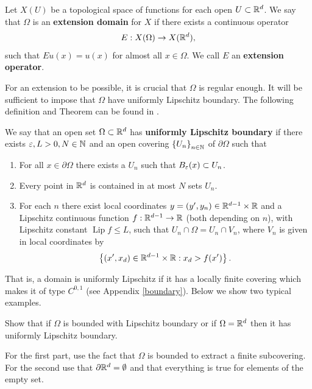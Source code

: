 \documentclass[
    a4paper,
    DIV=14,
    abstract=true,
    numbers=noenddot
]{scrartcl}
\begin{document}
\begin{definition}\label{extension domain}
	Let $X(U)$ be a topological space of functions for each open $U \subset \mathbb{R}^d$. We say that $\Omega $ is an \textbf{extension domain} for $X$ if there exists a continuous operator
	\begin{align*}
		E: X(\Omega ) \to X(\mathbb{R}^d),
	\end{align*}
	such that $Eu(x)=u(x)$ for almost all $x \in \Omega $. We call $E$ an \textbf{extension operator}.
\end{definition}

For an extension to be possible, it is crucial that $\Omega$ is regular enough. It will be sufficient to impose that $\Omega$ have uniformly Lipschitz boundary. The following definition and Theorem can be found in \cite[Section 13]{leoni2017first}.

\begin{definition}\label{uniformly Lipschitz domain}
	We say that an open set $\Omega \subset \mathbb{R}^d$ has \textbf{uniformly Lipschitz boundary} if there exists $\varepsilon,L>0, N \in \mathbb{N}$ and an open covering $\left\{U_n\right\}_{n \in \mathbb{N}}$ of $\partial \Omega$ such that
	\begin{enumerate}
		\item For all $x \in \partial \Omega$ there exists a $U_n$ such that $B_\varepsilon(x) \subset U_n$.
		\item Every point in $\mathbb{R}^d$ is contained in at most $N$ sets $U_n$.
		\item For each $n$ there exist local coordinates $y=(y', y_n) \in \mathbb{R}^{d-1} \times \mathbb{R}$ and a Lipschitz continuous function $f: \mathbb{R}^{d-1} \to \mathbb{R}$ (both depending on $n$), with Lipschitz constant $\operatorname{Lip} f \leq L$, such that $U_n \cap \Omega=U_n \cap V_n$, where $V_n$ is given in local coordinates by
		      \begin{align*}
			      \left\{(x', x_d) \in \mathbb{R}^{d-1} \times \mathbb{R}: x_d>f(x')\right\} .
		      \end{align*}
	\end{enumerate}
	That is, a domain is uniformly Lipschitz if it has a locally finite covering which makes it of type $C^{0,1}$ (see Appendix \ref{boundary}). Below we show two typical examples.
\end{definition}

\begin{exercise}\label{exercise lipschitz}
	Show that if $\Omega$ is bounded with Lipschitz boundary or if $\Omega=\mathbb{R}^d$ then it has uniformly Lipschitz boundary.
\end{exercise}
\begin{hint}
	For the first part, use the fact that $\Omega$ is bounded to extract a finite subcovering. For the second use that $\partial\mathbb{R}^d=\emptyset$ and that everything is true for elements of the empty set.
\end{hint}
\end{document}
